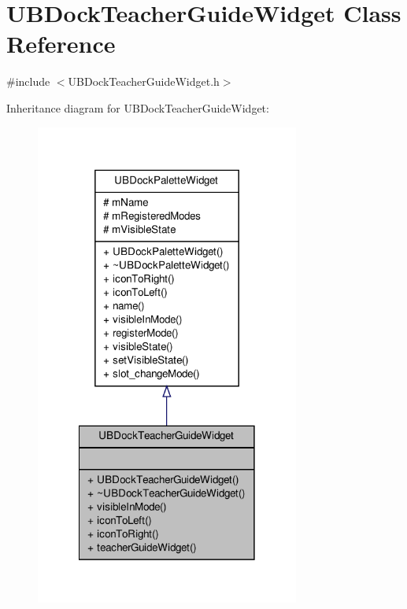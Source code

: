 \hypertarget{class_u_b_dock_teacher_guide_widget}{\section{U\-B\-Dock\-Teacher\-Guide\-Widget Class Reference}
\label{db/d9c/class_u_b_dock_teacher_guide_widget}
}


{\ttfamily \#include $<$U\-B\-Dock\-Teacher\-Guide\-Widget.\-h$>$}



Inheritance diagram for U\-B\-Dock\-Teacher\-Guide\-Widget\-:
\nopagebreak
\begin{figure}[H]
\begin{center}
\leavevmode
\includegraphics[width=246pt]{d7/df1/class_u_b_dock_teacher_guide_widget__inherit__graph}
\end{center}
\end{figure}


